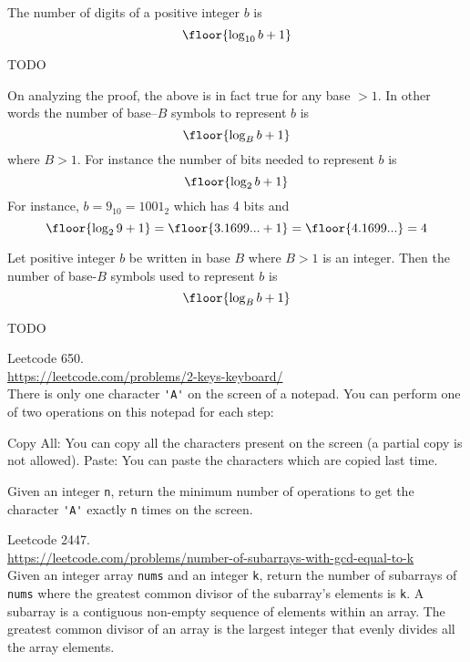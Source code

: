 \begin{prop}
  The number of digits of a positive integer $b$ is
  \[
  \floor{\log_{10} b + 1}
  \]
\end{prop}
\proof
TODO

On analyzing the proof, the above is in fact true for any base $> 1$.
In other words the number of base--$B$ symbols to represent $b$ is
\[
\floor{\log_{B} b + 1}
\]
where $B > 1$.
For instance the number of bits needed to represent $b$ is
\[
\floor{\log_{2} b + 1}
\]
For instance, $b = 9_{10} = 1001_2$ which has 4 bits and
\[
\floor{\log_{2} 9 + 1}
= \floor{3.1699... + 1}
= \floor{4.1699...}
= 4
\]

\begin{prop}
  Let positive integer $b$ be written in base $B$ where $B > 1$ is an integer.
  Then the number of base-$B$ symbols used to represent $b$ is
  \[
  \floor{\log_{B} b + 1}
  \]
\end{prop}
\proof
TODO

\begin{ex}
  Leetcode 650.
  \\
  \url{https://leetcode.com/problems/2-keys-keyboard/}
  \\
  There is only one character \verb!'A'! on the screen of a notepad.
  You can perform one of two operations on this notepad for each step:
  \begin{enumerate}[nosep]
    \li Copy All:
    You can copy all the characters present on the screen (a partial copy is
    not allowed).
    \li Paste: You can paste the characters which are copied last time.
  \end{enumerate}
  Given an integer \verb!n!, return the minimum number of operations to get the character \verb!'A'! exactly \verb!n! times on the screen.
\end{ex}


\begin{ex}
  Leetcode 2447.
  \\
  \url{https://leetcode.com/problems/number-of-subarrays-with-gcd-equal-to-k}
  \\
  Given an integer array \verb!nums! and an integer \verb!k!,
  return the number of subarrays of \verb!nums! where the greatest common
  divisor
  of the subarray's elements is \verb!k!.
  A subarray is a contiguous non-empty sequence of elements within an array.
  The greatest common divisor of an array is the largest integer that evenly
  divides all the array elements.
\end{ex}

